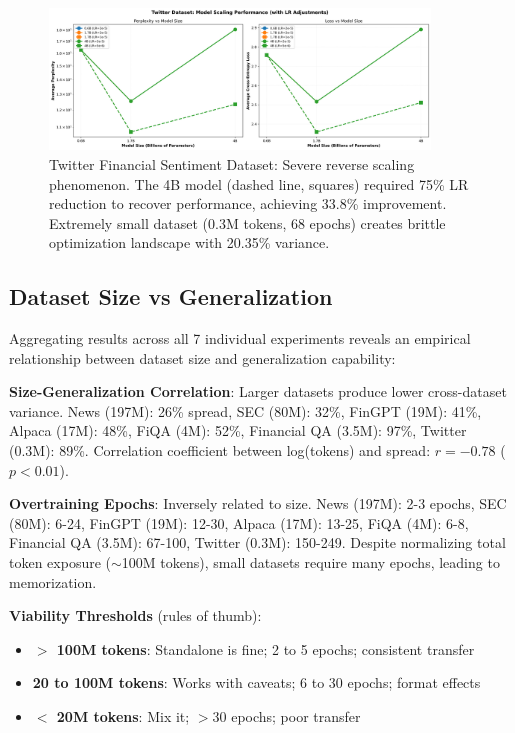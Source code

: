 \begin{figure}[h]
\centering
\includegraphics[width=0.9\textwidth]{figures/scaling_twitter.png}
\caption[Twitter Financial Sentiment Dataset: Reverse Scaling]{Twitter Financial Sentiment Dataset: Severe reverse scaling phenomenon. The 4B model (dashed line, squares) required 75\% LR reduction to recover performance, achieving 33.8\% improvement. Extremely small dataset (0.3M tokens, 68 epochs) creates brittle optimization landscape with 20.35\% variance.}
\label{fig:scaling_twitter}
\end{figure}





\subsection{Dataset Size vs Generalization}

Aggregating results across all 7 individual experiments reveals an empirical relationship between dataset size and generalization capability:

\textbf{Size-Generalization Correlation}: Larger datasets produce lower cross-dataset variance. News (197M): 26\% spread, SEC (80M): 32\%, FinGPT (19M): 41\%, Alpaca (17M): 48\%, FiQA (4M): 52\%, Financial QA (3.5M): 97\%, Twitter (0.3M): 89\%. Correlation coefficient between log(tokens) and spread: $r = -0.78$ ($p < 0.01$).

\textbf{Overtraining Epochs}: Inversely related to size. News (197M): 2-3 epochs, SEC (80M): 6-24, FinGPT (19M): 12-30, Alpaca (17M): 13-25, FiQA (4M): 6-8, Financial QA (3.5M): 67-100, Twitter (0.3M): 150-249. Despite normalizing total token exposure ($\sim$100M tokens), small datasets require many epochs, leading to memorization.

\textbf{Viability Thresholds} (rules of thumb):
\begin{itemize}
\item \textbf{$>$ 100M tokens}: Standalone is fine; 2 to 5 epochs; consistent transfer
\item \textbf{20 to 100M tokens}: Works with caveats; 6 to 30 epochs; format effects
\item \textbf{$<$ 20M tokens}: Mix it; $>$30 epochs; poor transfer
\end{itemize}

